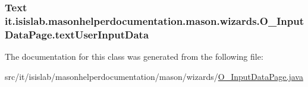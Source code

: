 \hypertarget{classit_1_1isislab_1_1masonhelperdocumentation_1_1mason_1_1wizards_1_1_o___input_data_page_a6a991af9288d1dff741881b12f02ee84}{
\subsubsection[{text\-User\-Input\-Data}]{\setlength{\rightskip}{0pt plus 5cm}Text it.\-isislab.\-masonhelperdocumentation.\-mason.\-wizards.\-O\-\_\-\-Input\-Data\-Page.\-text\-User\-Input\-Data\hspace{0.3cm}{\ttfamily [private]}}}\label{classit_1_1isislab_1_1masonhelperdocumentation_1_1mason_1_1wizards_1_1_o___input_data_page_a6a991af9288d1dff741881b12f02ee84}


The documentation for this class was generated from the following file\-:\begin{DoxyCompactItemize}
\item 
src/it/isislab/masonhelperdocumentation/mason/wizards/\hyperlink{_o___input_data_page_8java}{O\-\_\-\-Input\-Data\-Page.\-java}\end{DoxyCompactItemize}
